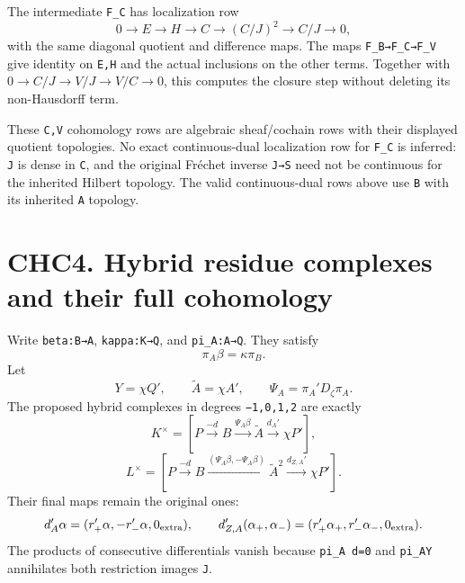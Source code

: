 The intermediate \texttt{F\_C} has localization row \[
0\to E\to H\to C\to(C/J)^2\to C/J\to0,
\tag{CHC3.4}
\] with the same diagonal quotient and difference maps. The maps
\texttt{F\_B→F\_C→F\_V} give identity on \texttt{E,H} and the actual
inclusions on the other terms. Together with
\(0\to C/J\to V/J\to V/C\to0\), this computes the closure step without
deleting its non-Hausdorff term.

These \texttt{C,V} cohomology rows are algebraic sheaf/cochain rows with
their displayed quotient topologies. No exact continuous-dual
localization row for \texttt{F\_C} is inferred: \texttt{J} is dense in
\texttt{C}, and the original Fréchet inverse \texttt{J→S} need not be
continuous for the inherited Hilbert topology. The valid continuous-dual
rows above use \texttt{B} with its inherited \texttt{A} topology.

\section{CHC4. Hybrid residue complexes and their full
cohomology}\label{chc4.-hybrid-residue-complexes-and-their-full-cohomology}

Write \texttt{beta:B→A}, \texttt{kappa:K→Q}, and \texttt{pi\_A:A→Q}.
They satisfy \[
\pi_A\beta=\kappa\pi_B.
\] Let \[
Y=\chi Q',\qquad \widetilde A=\chi A',\qquad
\Psi_A=\pi_A'D_\zeta\pi_A.
\] The proposed hybrid complexes in degrees \texttt{−1,0,1,2} are
exactly \[
K^\times=[P\xrightarrow{-d}B
\xrightarrow{\Psi_A\beta}\widetilde A
\xrightarrow{d_A'}\chi P'],
\tag{CHC4.1}
\] \[
L^\times=[P\xrightarrow{-d}B
\xrightarrow{(\Psi_A\beta,-\Psi_A\beta)}\widetilde A^2
\xrightarrow{d_{Z,A}'}\chi P'].
\tag{CHC4.2}
\] Their final maps remain the original ones: \[
d_A'\alpha=(r_+'\alpha,-r_-'\alpha,0_{\rm extra}),
\qquad
d_{Z,A}'(\alpha_+,\alpha_-)
=(r_+'\alpha_+,r_-'\alpha_-,0_{\rm extra}).
\] The products of consecutive differentials vanish because
\texttt{pi\_A\ d=0} and \texttt{pi\_A\textquotesingle{}Y} annihilates
both restriction images \texttt{J}.

